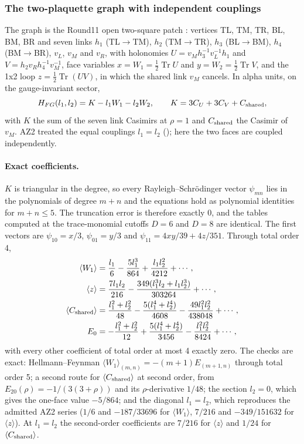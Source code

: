 \subsubsection{The two-plaquette graph with independent couplings}
\label{sec:bd2-graph}
The graph is the Round11 open two-square patch \cite{r11}: vertices TL, TM, TR, BL, BM,
BR and seven links $h_1$ (TL$\to$TM), $h_2$ (TM$\to$TR), $h_3$ (BL$\to$BM),
$h_4$ (BM$\to$BR), $v_L$, $v_M$ and $v_R$, with holonomies
$U=v_Mh_3^{-1}v_L^{-1}h_1$ and $V=h_2v_Rh_4^{-1}v_M^{-1}$, face variables
$x=W_1=\tfrac12\operatorname{Tr}U$ and $y=W_2=\tfrac12\operatorname{Tr}V$, and the 1x2
loop $z=\tfrac12\operatorname{Tr}(UV)$, in which the shared link $v_M$ cancels.
In alpha units, on the gauge-invariant sector,
\begin{equation}
 H_{FG}(l_1,l_2)=K-l_1W_1-l_2W_2,\qquad K=3C_U+3C_V+C_{\rm shared},
 \label{eq:bd2-graph}
\end{equation}
with $K$ the sum of the seven link Casimirs at $\rho=1$ and $C_{\rm shared}$
the Casimir of $v_M$. AZ2 treated the equal couplings $l_1=l_2$
(); here the two
faces are coupled independently.

\paragraph{Exact coefficients.} $K$ is triangular in the degree, so every
Rayleigh--Schr\"odinger vector $\psi_{mn}$ lies in the polynomials of degree
$m+n$ and the equations hold as polynomial identities for $m+n\le5$. The
truncation error is therefore exactly 0, and the tables computed at the
trace-monomial cutoffs $D=6$ and $D=8$ are identical. The first vectors are
$\psi_{10}=x/3$, $\psi_{01}=y/3$ and $\psi_{11}=4xy/39+4z/351$. Through total
order 4,
\begin{equation}
 \begin{aligned}
 \langle W_1\rangle&=\frac{l_1}6-\frac{5l_1^3}{864}+\frac{l_1l_2^2}{4212}+\cdots,\\
 \langle z\rangle&=\frac{7l_1l_2}{216}-\frac{349(l_1^3l_2+l_1l_2^3)}{303264}+\cdots,\\
 \langle C_{\rm shared}\rangle&=\frac{l_1^2+l_2^2}{48}-\frac{5(l_1^4+l_2^4)}{4608}-\frac{49l_1^2l_2^2}{438048}+\cdots,\\
 E_0&=-\frac{l_1^2+l_2^2}{12}+\frac{5(l_1^4+l_2^4)}{3456}-\frac{l_1^2l_2^2}{8424}+\cdots,
 \end{aligned}
 \label{eq:bd2-series}
\end{equation}
with every other coefficient of total order at most 4 exactly zero. The
checks are exact: Hellmann--Feynman
$\langle W_1\rangle_{(m,n)}=-(m+1)E_{(m+1,n)}$ through total order 5; a second
route for $\langle C_{\rm shared}\rangle$ at second order, from
$E_{20}(\rho)=-1/(3(3+\rho))$ and its $\rho$-derivative $1/48$; the section
$l_2=0$, which gives the one-face value $-5/864$; and the diagonal $l_1=l_2$,
which reproduces the admitted AZ2 series ($1/6$ and $-187/33696$ for
$\langle W_1\rangle$, $7/216$ and $-349/151632$ for $\langle z\rangle$). At
$l_1=l_2$ the second-order coefficients are $7/216$ for $\langle z\rangle$ and
$1/24$ for $\langle C_{\rm shared}\rangle$.


